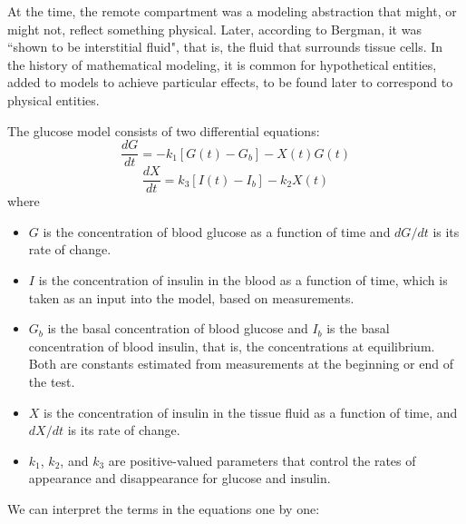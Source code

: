 \documentclass[12pt]{book}
\theoremstyle{exercise}
\begin{document}
At the time, the remote compartment was a modeling abstraction that might, or might not, reflect something physical.  Later, according to Bergman, it was ``shown to be interstitial fluid", that is, the fluid that surrounds tissue cells.  In the history of mathematical modeling, it is common for hypothetical entities, added to models to achieve particular effects, to be found later to correspond to physical entities.

The glucose model consists of two differential equations:
%
\[ \frac{dG}{dt} = -k_1 \left[ G(t) - G_b \right] - X(t) G(t)  \]
%
\[ \frac{dX}{dt} = k_3 \left[I(t) - I_b \right] - k_2 X(t) \]
%
where

\begin{itemize}

\item $G$ is the concentration of blood glucose as a function of time and $dG/dt$ is its rate of change.

\item $I$ is the concentration of insulin in the blood as a function of time, which is taken as an input into the model, based on measurements.

\item $G_b$ is the basal concentration of blood glucose and $I_b$ is the basal concentration of blood insulin, that is, the concentrations at equilibrium.  Both are constants estimated from measurements at the beginning or end of the test.

\item $X$ is the concentration of insulin in the tissue fluid as a function of time, and $dX/dt$ is its rate of change.

\item $k_1$, $k_2$, and $k_3$ are positive-valued parameters that control the rates of appearance and disappearance for glucose and insulin. 

\end{itemize}

We can interpret the terms in the equations one by one:
\end{document}
